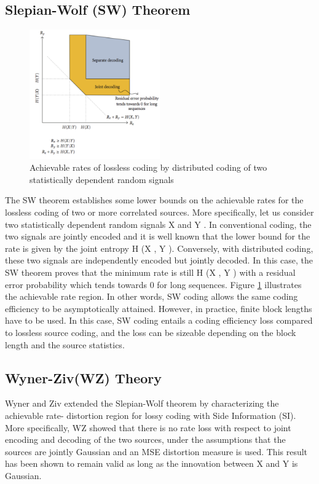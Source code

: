 \documentclass[letterpaper,12pt,titlepage,oneside,final]{report}
\begin{document}
        \subsection{Slepian-Wolf (SW) Theorem}
            \begin{figure}[!h]
                \centering
                \includegraphics[width=0.5\textwidth]{swtheory}
                \caption{Achievable rates of lossless coding by distributed coding of two statistically dependent random signals\cite{Dufaux2009}}
                \label{swtheory}
            \end{figure}
            The SW theorem establishes some lower bounds on the achievable rates for the lossless coding of two or more correlated sources. More specifically, let us consider two statistically dependent random signals X and Y . In conventional coding, the two signals are jointly encoded and it is well known that the lower bound for the rate is given by the joint entropy H (X , Y ). Conversely, with distributed coding, these two signals are independently encoded but jointly decoded. In this case, the SW theorem proves that the minimum rate is still H (X , Y ) with a residual error probability which tends towards 0 for long sequences. Figure \ref{swtheory} illustrates the achievable rate region. In other words, SW coding allows the same coding efficiency to be asymptotically attained. However, in practice, finite block lengths have to be used. In this case, SW coding entails a coding efficiency loss compared to lossless source coding, and the loss can be sizeable depending on the block length and the source statistics.
        \subsection{Wyner-Ziv(WZ) Theory}
            Wyner and Ziv extended the Slepian-Wolf theorem by characterizing the achievable rate- distortion region for lossy coding with Side Information (SI). More specifically, WZ showed that there is no rate loss with respect to joint encoding and decoding of the two sources, under the assumptions that the sources are jointly Gaussian and an MSE distortion measure is used. This result has been shown to remain valid as long as the innovation between X and Y is Gaussian.
\end{document}
